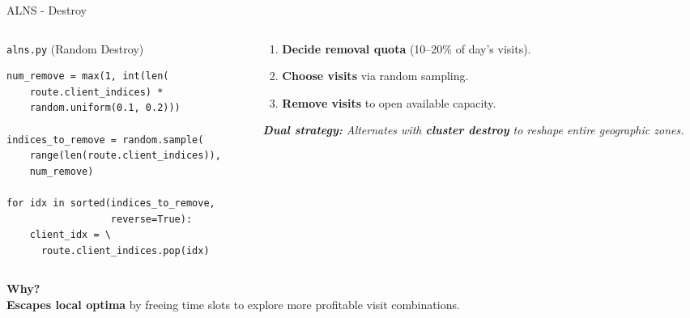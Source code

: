 \begin{frame}[fragile]{ALNS - Destroy}
\begin{columns}[T,onlytextwidth]
\begin{column}{0.48\textwidth}
\begin{block}{\texttt{alns.py} (Random Destroy)}
\scriptsize
\begin{verbatim}
num_remove = max(1, int(len(
    route.client_indices) * 
    random.uniform(0.1, 0.2)))

indices_to_remove = random.sample(
    range(len(route.client_indices)), 
    num_remove)

for idx in sorted(indices_to_remove, 
                  reverse=True):
    client_idx = \
      route.client_indices.pop(idx)
\end{verbatim}
\end{block}
\end{column}

\begin{column}{0.48\textwidth}
\vspace{0.15cm}
\footnotesize
\begin{enumerate}
    \item \textbf{Decide removal quota} (10--20\% of day's visits).
    \vspace{0.2cm}
    \item \textbf{Choose visits} via random sampling.
    \vspace{0.2cm}
    \item \textbf{Remove visits} to open available capacity.
\end{enumerate}

\vspace{0.25cm}
\textit{\textbf{Dual strategy:} Alternates with \textbf{cluster destroy} to reshape entire geographic zones.}
\end{column}
\end{columns}

\vspace{0.3cm}
\footnotesize
\textbf{Why?}\\
\textbf{Escapes local optima} by freeing time slots to explore more profitable visit combinations.
\end{frame}
